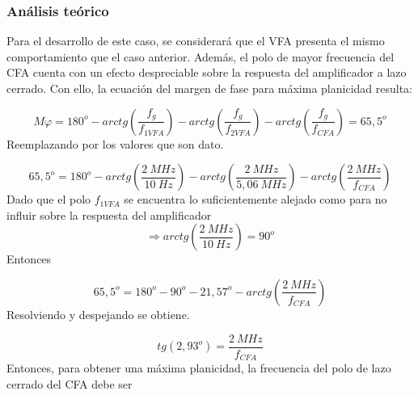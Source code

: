 \documentclass[a4paper,12pt]{article}
\begin{document}
\subsubsection{Análisis teórico}
\vspace{0,2cm}
\hspace{1mm}Para el desarrollo de este caso, se considerará que el VFA presenta el mismo comportamiento que el caso anterior. Además, el polo de mayor frecuencia del CFA cuenta con un efecto despreciable sobre la respuesta del amplificador a lazo cerrado.
Con ello, la ecuación del margen de fase para máxima planicidad resulta:

\begin{equation}
    M \varphi = 180^o - arctg \left(\frac{f_g}{f_{1VFA}}\right) - arctg \left(\frac{f_g}{f_{2VFA}}\right) - arctg \left(\frac{f_g}{f_{CFA}}\right) = 65,5^o
\end{equation}
\vspace{0.2cm}
\hspace{1mm}Reemplazando por los valores que son dato.

\begin{equation}
    65,5^o = 180^o - arctg \left(\frac{2~MHz}{10~Hz}\right) - arctg \left(\frac{2~MHz}{5,06~MHz}\right) - arctg \left(\frac{2~MHz}{f_{CFA}}\right)
\end{equation}
\vspace{0.2cm}
\hspace{1mm}Dado que el polo $ f_{1VFA} $ se encuentra lo suficientemente alejado como para no influir sobre la respuesta del amplificador
\begin{equation}
    \Longrightarrow arctg \left(\frac{2~MHz}{10~Hz}\right) = 90^o
\end{equation}
\vspace{0.2cm}
\hspace{1mm}Entonces

\begin{equation}
    65,5^o = 180^o - 90^o - 21,57^o - arctg \left(\frac{2~MHz}{f_{CFA}}\right)
\end{equation}
\vspace{0,2cm}
\hspace{1mm}Resolviendo y despejando se obtiene.

\begin{equation}
    tg (2,93^o) = \frac{2~MHz}{f_{CFA}}
\end{equation}
\vspace{0,2cm}
\hspace{1mm}Entonces, para obtener una máxima planicidad, la frecuencia del polo de lazo cerrado del CFA debe ser
\end{document}
